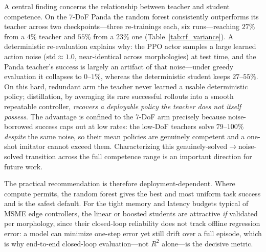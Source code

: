 \documentclass[conference]{IEEEtran}
\begin{document}
A central finding concerns the relationship between teacher and student
competence. On the 7-DoF Panda the random forest consistently outperforms its
teacher across two checkpoints---three re-trainings each, six runs---reaching
$27\%$ from a $4\%$ teacher and $55\%$ from a $23\%$ one
(Table~\ref{tab:rf_variance}). A deterministic re-evaluation explains why: the
PPO actor samples a large learned action noise ($\mathrm{std}\!\approx\!1.0$,
near-identical across morphologies) at test time, and the Panda teacher's
success is largely an artifact of that noise---under greedy evaluation it
collapses to $0$--$1\%$, whereas the deterministic student keeps $27$--$55\%$.
On this hard, redundant arm the teacher never learned a usable deterministic
policy; distillation, by averaging its rare successful rollouts into a smooth
repeatable controller, \emph{recovers a deployable policy the teacher does not
itself possess}. The advantage is confined to the 7-DoF arm precisely because
noise-borrowed success caps out at low rates: the low-DoF teachers solve
$79$--$100\%$ \emph{despite} the same noise, so their mean policies are genuinely
competent and a one-shot imitator cannot exceed them. Characterizing this
genuinely-solved$\rightarrow$noise-solved transition across the full competence
range is an important direction for future work.

The practical recommendation is therefore deployment-dependent. Where compute
permits, the random forest gives the best and most uniform task success and is the
safest default. For the tight memory and latency budgets typical of MSME edge
controllers, the linear or boosted students are attractive \emph{if} validated
per morphology, since their closed-loop reliability does not track offline
regression error: a model can minimize one-step error yet still drift over a full
episode, which is why end-to-end closed-loop evaluation---not $R^2$ alone---is the
decisive metric.

\end{document}
